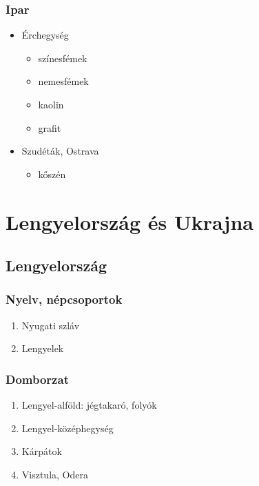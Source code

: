 \documentclass{article}
\begin{document}
\subsubsection{Ipar}
\begin{itemize} 
    \item Érchegység 
    
    \begin{itemize}
        \item színesfémek
        \item nemesfémek
        \item kaolin
        \item grafit
    \end{itemize}
    
    \item Szudéták, Ostrava

    \begin{itemize}
        \item kőszén
    \end{itemize}
    
\end{itemize}
\newpage

\section{Lengyelország és Ukrajna}
\subsection{Lengyelország}
\subsubsection{Nyelv, népcsoportok}

\begin{enumerate}
    \item Nyugati szláv
    \item Lengyelek
\end{enumerate}

\subsubsection{Domborzat}

\begin{enumerate}
    \item Lengyel-alföld: jégtakaró, folyók
    \item Lengyel-középhegység
    \item Kárpátok
    \item Visztula, Odera
\end{enumerate}
\end{document}
